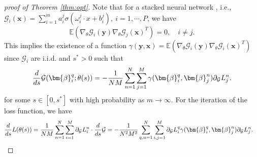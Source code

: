 \documentclass[preprint,12pt]{elsarticle}
\theoremstyle{plain}
\numberwithin{figure}{section}
\numberwithin{table}{section}
\begin{document}
\begin{proof}[proof of Theorem \ref{thm:opt}]
	Note that for a stacked neural network , i.e., $\mathcal{G}_i(\bm{x})=\sum_{i=1}^m a_i^j\sigma(\omega_i^j\cdot x+b_i^j),~i=1,\cdots,P$, we have
	$$\mathbb{E}(\nabla_\theta\mathcal{G}_i(\bm{y})\nabla_\theta\mathcal{G}_j(\bm{x})^T)=0, \quad i\neq j. $$
	This implies the existence of a function $\gamma(\bm{y},\bm{x})=\mathbb{E}(\nabla_\theta\mathcal{G}_i(\bm{y})\nabla_\theta\mathcal{G}_i(\bm{x})^T)$ since $\mathcal{G}_i$ are i.i.d. and $s^*>0$ such that
	\begin{equation}
		\frac{d}{ds}\mathcal{G}(\bm{\beta}_i^q;\theta(s)) = -{1\over NM}\sum_{n=1}^N\sum_{j=1}^M  \gamma(\bm{\beta}_i^q,\bm{\beta}_j^n)\partial_{\mathcal{G}}{L}_j^n.
	\end{equation}
	for some $s\in [0,s^*]$ with high probability \cite{yang2025homotopy} as $m\rightarrow\infty$. For the iteration of the loss function, we have
	\begin{equation}
		\begin{aligned}
			{d\over ds}L(\theta(s)) &= {1\over NM}\sum_{n=1}^N\sum_{i=1}^M\partial_{\mathcal{G}}L_i^n\cdot \frac{d}{ds}\mathcal{G}=-{1\over N^2M^2}\sum_{q,n=1}^N\sum_{i,j=1}^M \partial_{\mathcal{G}}L_i^q\gamma(\bm{\beta}_i^q,\bm{\beta}_j^n)\partial_{\mathcal{G}}{L}_j^n.
		\end{aligned}
	\end{equation}
	

\end{proof}
\end{document}
